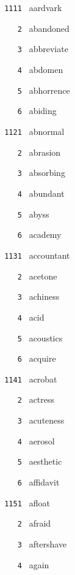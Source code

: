 \documentclass[11pt]{article}
\begin{document}
\begin{multicols}{6}
\small
\noindent \texttt{ 1111 } aardvark  \par
\noindent \texttt{ \ \ \ 2 } abandoned  \par
\noindent \texttt{ \ \ \ 3 } abbreviate  \par
\noindent \texttt{ \ \ \ 4 } abdomen  \par
\noindent \texttt{ \ \ \ 5 } abhorrence  \par
\noindent \texttt{ \ \ \ 6 } abiding  \par
\vspace{3mm}
\noindent \texttt{ 1121 } abnormal  \par
\noindent \texttt{ \ \ \ 2 } abrasion  \par
\noindent \texttt{ \ \ \ 3 } absorbing  \par
\noindent \texttt{ \ \ \ 4 } abundant  \par
\noindent \texttt{ \ \ \ 5 } abyss  \par
\noindent \texttt{ \ \ \ 6 } academy  \par
\vspace{3mm}
\noindent \texttt{ 1131 } accountant  \par
\noindent \texttt{ \ \ \ 2 } acetone  \par
\noindent \texttt{ \ \ \ 3 } achiness  \par
\noindent \texttt{ \ \ \ 4 } acid  \par
\noindent \texttt{ \ \ \ 5 } acoustics  \par
\noindent \texttt{ \ \ \ 6 } acquire  \par
\vspace{3mm}
\noindent \texttt{ 1141 } acrobat  \par
\noindent \texttt{ \ \ \ 2 } actress  \par
\noindent \texttt{ \ \ \ 3 } acuteness  \par
\noindent \texttt{ \ \ \ 4 } aerosol  \par
\noindent \texttt{ \ \ \ 5 } aesthetic  \par
\noindent \texttt{ \ \ \ 6 } affidavit  \par
\vspace{3mm}
\noindent \texttt{ 1151 } afloat  \par
\noindent \texttt{ \ \ \ 2 } afraid  \par
\noindent \texttt{ \ \ \ 3 } aftershave  \par
\noindent \texttt{ \ \ \ 4 } again  \par

\end{multicols}
\end{document}
